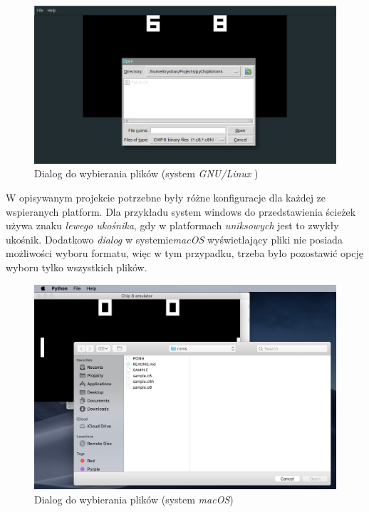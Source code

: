 \begin{figure}[!htb]
\begin{center}
	\includegraphics[scale=0.32]{images/fileDialog}
	\caption{Dialog do wybierania plików (system \textit{GNU/Linux })}
\end{center}
\end{figure}

 W opisywanym projekcie potrzebne były różne konfiguracje dla każdej ze wspieranych platform. Dla przykładu system windows do przedstawienia ścieżek używa znaku \textit{lewego ukośnika}, gdy w platformach \textit{uniksowych} jest to zwykły ukośnik. Dodatkowo \textit{dialog} w systemie\textit{macOS}  wyświetlający pliki nie posiada możliwości wyboru formatu, więc w tym przypadku, trzeba było pozostawić opcję wyboru tylko wszystkich plików.
 
\begin{figure}[!htb]
\begin{center}
	\includegraphics[scale=0.3]{images/fileDialog-macos}
	\caption{Dialog do wybierania plików (system \textit{macOS})}
\end{center}
\end{figure}

